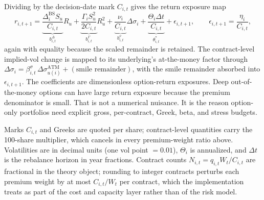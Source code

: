Dividing by the decision-date mark \(C_{i,t}\) gives the return exposure map
\[
 r_{i,t+1}
 =
 \underbrace{\frac{\Delta^{\mathrm{BS}}_i S_u}{C_{i,t}}}_{b^\Delta_{i,t}}R_u
 +\underbrace{\frac{\Gamma_i S_u^2}{2C_{i,t}}}_{b^\Gamma_{i,t}}R_u^2
 +\underbrace{\frac{\nu_i}{C_{i,t}}}_{b^\nu_{i,t}}\Delta\sigma_i
 +\underbrace{\frac{\Theta_i\Delta t}{C_{i,t}}}_{\theta^{\ast}_{i,t}}
 +\epsilon_{i,t+1},
 \qquad
 \epsilon_{i,t+1}=\frac{\eta_i}{C_{i,t}},
\]
again with equality because the scaled remainder is retained. The contract-level implied-vol
change is mapped to its underlying's at-the-money factor through
\(\Delta\sigma_i=\beta^{\sigma}_{i,t}\,\Delta\sigma^{\mathrm{ATM}}_{u(i)}
+(\text{smile remainder})\), with the smile remainder absorbed into \(\epsilon_{i,t+1}\).
The coefficients are dimensionless option-return exposures. Deep out-of-the-money options
can have large return exposure because the premium denominator is small. That is not a
numerical nuisance. It is the reason option-only portfolios need explicit gross,
per-contract, Greek, beta, and stress budgets.

\begin{remark}\label{rem:units}
Marks \(C_{i,t}\) and Greeks are quoted per share; contract-level quantities carry the
100-share multiplier, which cancels in every premium-weight ratio above. Volatilities are
in decimal units (one vol point \(=0.01\)), \(\Theta_i\) is annualized, and \(\Delta t\) is
the rebalance horizon in year fractions. Contract counts \(N_{i,t}=q_{i,t}W_t/C_{i,t}\) are
fractional in the theory object; rounding to integer contracts perturbs each premium weight
by at most \(C_{i,t}/W_t\) per contract, which the implementation treats as part of the
cost and capacity layer rather than of the risk model.
\end{remark}

